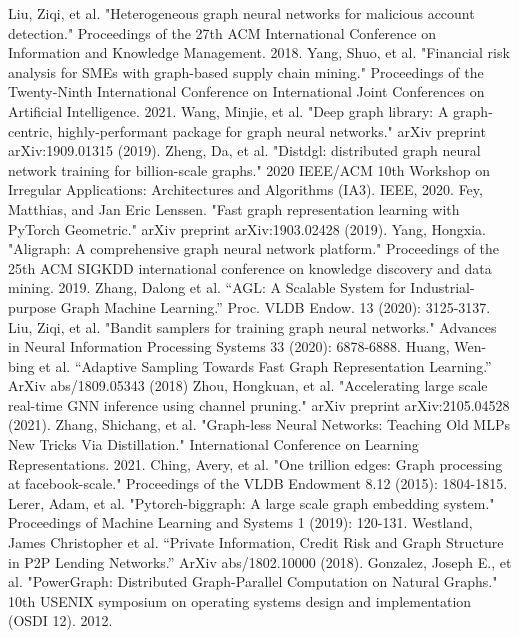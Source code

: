 \documentclass[conference]{IEEEtran}
\begin{document}
\begin{thebibliography}{00}
 Liu, Ziqi, et al. "Heterogeneous graph neural networks for malicious account detection." Proceedings of the 27th ACM International Conference on Information and Knowledge Management. 2018.
Yang, Shuo, et al. "Financial risk analysis for SMEs with graph-based supply chain mining." Proceedings of the Twenty-Ninth International Conference on International Joint Conferences on Artificial Intelligence. 2021.
 Wang, Minjie, et al. "Deep graph library: A graph-centric, highly-performant package for graph neural networks." arXiv preprint arXiv:1909.01315 (2019).
 Zheng, Da, et al. "Distdgl: distributed graph neural network training for billion-scale graphs." 2020 IEEE/ACM 10th Workshop on Irregular Applications: Architectures and Algorithms (IA3). IEEE, 2020.
 Fey, Matthias, and Jan Eric Lenssen. "Fast graph representation learning with PyTorch Geometric." arXiv preprint arXiv:1903.02428 (2019).
 Yang, Hongxia. "Aligraph: A comprehensive graph neural network platform." Proceedings of the 25th ACM SIGKDD international conference on knowledge discovery and data mining. 2019.
 Zhang, Dalong et al. “AGL: A Scalable System for Industrial-purpose Graph Machine Learning.” Proc. VLDB Endow. 13 (2020): 3125-3137.
 Liu, Ziqi, et al. "Bandit samplers for training graph neural networks." Advances in Neural Information Processing Systems 33 (2020): 6878-6888.
 Huang, Wen-bing et al. “Adaptive Sampling Towards Fast Graph Representation Learning.” ArXiv abs/1809.05343 (2018)
 Zhou, Hongkuan, et al. "Accelerating large scale real-time GNN inference using channel pruning." arXiv preprint arXiv:2105.04528 (2021).
 Zhang, Shichang, et al. "Graph-less Neural Networks: Teaching Old MLPs New Tricks Via Distillation." International Conference on Learning Representations. 2021.
 Ching, Avery, et al. "One trillion edges: Graph processing at facebook-scale." Proceedings of the VLDB Endowment 8.12 (2015): 1804-1815.
 Lerer, Adam, et al. "Pytorch-biggraph: A large scale graph embedding system." Proceedings of Machine Learning and Systems 1 (2019): 120-131.
  Westland, James Christopher et al. “Private Information, Credit Risk and Graph Structure in P2P Lending Networks.” ArXiv abs/1802.10000 (2018).
 Gonzalez, Joseph E., et al. "{PowerGraph}: Distributed {Graph-Parallel} Computation on Natural Graphs." 10th USENIX symposium on operating systems design and implementation (OSDI 12). 2012.

\end{thebibliography}
\end{document}
